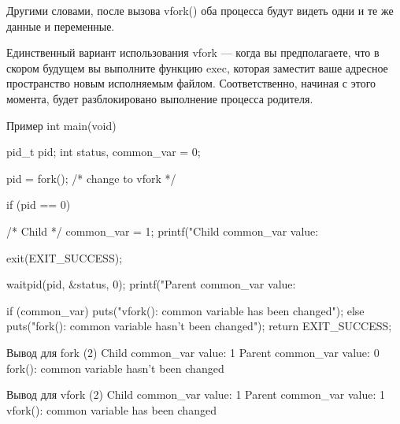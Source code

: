 Другими словами, после вызова vfork() оба процесса будут видеть одни и те же данные и переменные.

Единственный вариант использования vfork --- когда вы предполагаете, что в скором будущем вы выполните функцию exec, которая заместит ваше адресное пространство новым исполняемым файлом. Соответственно, начиная с этого момента, будет разблокировано выполнение процесса родителя.

\begin{CCode}{Пример}
	int main(void) {
		pid_t pid;
		int status, common_var = 0;
	
		pid = fork(); /* change to vfork */
	
	    if (pid == 0) {
	        /* Child  */
			common_var = 1;
			printf("Child common_var value: %
			
			exit(EXIT_SUCCESS);
		}   
		waitpid(pid, &status, 0);
		printf("Parent common_var value: %
		
		if (common_var) {
			puts("vfork(): common variable has been changed");
		} else {
			puts("fork(): common variable hasn't been changed");
		}   
		return EXIT_SUCCESS; 
	} \end{CCode}

\begin{CCode}{Вывод для fork (2)}
	Child common_var value: 1 
	Parent common_var value: 0 
	fork(): common variable hasn't been changed \end{CCode}

\begin{CCode}{Вывод для vfork (2)}
	Child common_var value: 1 
	Parent common_var value: 1 
	vfork(): common variable has been changed \end{CCode}
